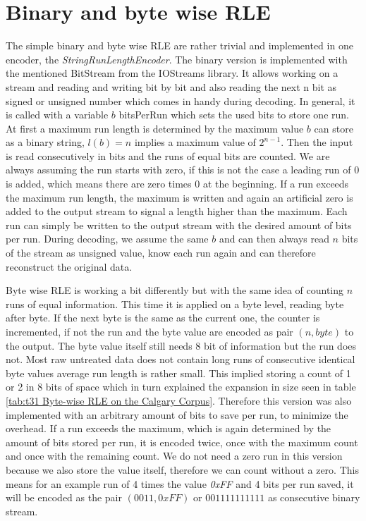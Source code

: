 \section{Binary and byte wise RLE}
\par{
	The simple binary and byte wise RLE are rather trivial and implemented in one encoder, the \textit{StringRunLengthEncoder}. The binary version is implemented with the mentioned BitStream from the IOStreams library. It allows working on a stream and reading and writing bit by bit and also reading the next n bit as signed or unsigned number which comes in handy during decoding. In general, it is called with a variable $b$ bitsPerRun which sets the used bits to store one run. At first a maximum run length is determined by the maximum value $b$ can store as a binary string, $l(b) = n$ implies a maximum value of $2^{n-1}$. Then the input is read consecutively in bits and the runs of equal bits are counted. We are always assuming the run starts with zero, if this is not the case a leading run of 0 is added, which means there are zero times 0 at the beginning. If a run exceeds the maximum run length, the maximum is written and again an artificial zero is added to the output stream to signal a length higher than the maximum. Each run can simply be written to the output stream with the desired amount of bits per run. During decoding, we assume the same $b$ and can then always read $n$ bits of the stream as unsigned value, know each run again and can therefore reconstruct the original data.
}
\par{
	Byte wise RLE is working a bit differently but with the same idea of counting $n$ runs of equal information. This time it is applied on a byte level, reading byte after byte. If the next byte is the same as the current one, the counter is incremented, if not the run and the byte value are encoded as pair $(n, byte)$ to the output. The byte value itself still needs 8 bit of information but the run does not. Most raw untreated data does not contain long runs of consecutive identical byte values average run length is rather small. This implied storing a count of 1 or 2 in 8 bits of space which in turn explained the expansion in size seen in table \ref{tab:t31 Byte-wise RLE on the Calgary Corpus}. Therefore this version was also implemented with an arbitrary amount of bits to save per run, to minimize the overhead. If a run exceeds the maximum, which is again determined by the amount of bits stored per run, it is encoded twice, once with the maximum count and once with the remaining count. We do not need a zero run in this version because we also store the value itself, therefore we can count without a zero. This means for an example run of 4 times the value \textit{0xFF} and 4 bits per run saved, it will be encoded as the pair $(0011,0xFF)$ or $001111111111$ as consecutive binary stream.
}

